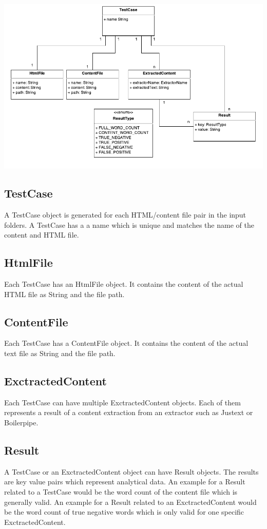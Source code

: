 \includegraphics[width=14cm]{Figures/dataModel.pdf}


\subsection{TestCase}
A TestCase object is generated for each HTML/content file pair in the input folders. A TestCase has a a name which is unique and matches the name of the content and HTML file.

\subsection{HtmlFile}
Each TestCase has an HtmlFile object. It contains the content of the actual HTML file as String and the file path.

\subsection{ContentFile}
Each TestCase has a ContentFile object. It contains the content of the actual text file as String and the file path.

\subsection{ExctractedContent}
Each TestCase can have multiple ExctractedContent objects. Each of them represents a result of a content extraction from an extractor such as Justext or Boilerpipe.

\subsection{Result}
A TestCase or an ExctractedContent object can have Result objects. The results are key value pairs which represent analytical data. An example for a Result related to a TestCase would be the word count of the content file which is generally valid. An example for a Result related to an ExctractedContent would be the word count of true negative words which is only valid for one specific ExctractedContent.



